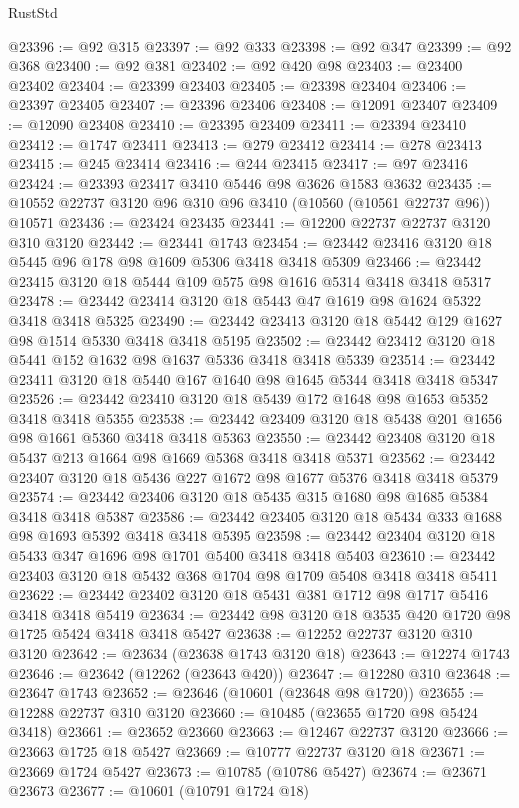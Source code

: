 \begin{lexlean}{RustStd}
\begin{coremodule}
@23396 := @92 @315
@23397 := @92 @333
@23398 := @92 @347
@23399 := @92 @368
@23400 := @92 @381
@23402 := @92 @420 @98
@23403 := @23400 @23402
@23404 := @23399 @23403
@23405 := @23398 @23404
@23406 := @23397 @23405
@23407 := @23396 @23406
@23408 := @12091 @23407
@23409 := @12090 @23408
@23410 := @23395 @23409
@23411 := @23394 @23410
@23412 := @1747 @23411
@23413 := @279 @23412
@23414 := @278 @23413
@23415 := @245 @23414
@23416 := @244 @23415
@23417 := @97 @23416
@23424 := @23393 @23417 @3410 @5446 @98 @3626 @1583 @3632
@23435 := @10552 @22737 @3120 @96 @310 @96 @3410 (@10560 (@10561 @22737 @96)) @10571
@23436 := @23424 @23435
@23441 := @12200 @22737 @22737 @3120 @310 @3120
@23442 := @23441 @1743
@23454 := @23442 @23416 @3120 @18 @5445 @96 @178 @98 @1609 @5306 @3418 @3418 @5309
@23466 := @23442 @23415 @3120 @18 @5444 @109 @575 @98 @1616 @5314 @3418 @3418 @5317
@23478 := @23442 @23414 @3120 @18 @5443 @47 @1619 @98 @1624 @5322 @3418 @3418 @5325
@23490 := @23442 @23413 @3120 @18 @5442 @129 @1627 @98 @1514 @5330 @3418 @3418 @5195
@23502 := @23442 @23412 @3120 @18 @5441 @152 @1632 @98 @1637 @5336 @3418 @3418 @5339
@23514 := @23442 @23411 @3120 @18 @5440 @167 @1640 @98 @1645 @5344 @3418 @3418 @5347
@23526 := @23442 @23410 @3120 @18 @5439 @172 @1648 @98 @1653 @5352 @3418 @3418 @5355
@23538 := @23442 @23409 @3120 @18 @5438 @201 @1656 @98 @1661 @5360 @3418 @3418 @5363
@23550 := @23442 @23408 @3120 @18 @5437 @213 @1664 @98 @1669 @5368 @3418 @3418 @5371
@23562 := @23442 @23407 @3120 @18 @5436 @227 @1672 @98 @1677 @5376 @3418 @3418 @5379
@23574 := @23442 @23406 @3120 @18 @5435 @315 @1680 @98 @1685 @5384 @3418 @3418 @5387
@23586 := @23442 @23405 @3120 @18 @5434 @333 @1688 @98 @1693 @5392 @3418 @3418 @5395
@23598 := @23442 @23404 @3120 @18 @5433 @347 @1696 @98 @1701 @5400 @3418 @3418 @5403
@23610 := @23442 @23403 @3120 @18 @5432 @368 @1704 @98 @1709 @5408 @3418 @3418 @5411
@23622 := @23442 @23402 @3120 @18 @5431 @381 @1712 @98 @1717 @5416 @3418 @3418 @5419
@23634 := @23442 @98 @3120 @18 @3535 @420 @1720 @98 @1725 @5424 @3418 @3418 @5427
@23638 := @12252 @22737 @3120 @310 @3120
@23642 := @23634 (@23638 @1743 @3120 @18)
@23643 := @12274 @1743
@23646 := @23642 (@12262 (@23643 @420))
@23647 := @12280 @310
@23648 := @23647 @1743
@23652 := @23646 (@10601 (@23648 @98 @1720))
@23655 := @12288 @22737 @310 @3120
@23660 := @10485 (@23655 @1720 @98 @5424 @3418)
@23661 := @23652 @23660
@23663 := @12467 @22737 @3120
@23666 := @23663 @1725 @18 @5427
@23669 := @10777 @22737 @3120 @18
@23671 := @23669 @1724 @5427
@23673 := @10785 (@10786 @5427)
@23674 := @23671 @23673
@23677 := @10601 (@10791 @1724 @18)

\end{coremodule}
\end{lexlean}
